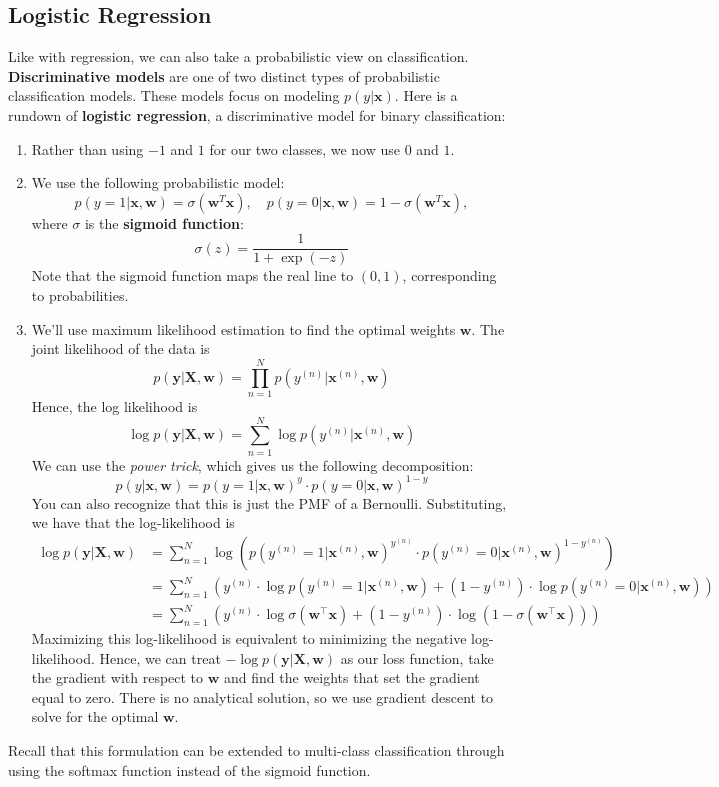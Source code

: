 \documentclass[11pt, letterpaper]{article}
\theoremstyle{definition}
\theoremstyle{plain}
\begin{document}
\subsection{Logistic Regression}

Like with regression, we can also take a probabilistic view on classification. \textbf{Discriminative models} are one of two distinct types of probabilistic classification models. These models focus on modeling $p(y | \bm x)$. Here is a rundown of \textbf{logistic regression}, a discriminative model for binary classification:
\begin{enumerate}
    \item Rather than using $-1$ and $1$ for our two classes, we now use $0$ and $1$. 
    
    \item We use the following probabilistic model:
    \[p(y = 1 | \bm{x}, \bm w) = \sigma(\bm{w}^{T}\bm{x}), \quad p(y = 0 | \bm{x}, \bm w) = 1 - \sigma(\bm{w}^{T}\bm{x} ),\]
    where $\sigma$ is the \textbf{sigmoid function}:
    \[\sigma(z) = \frac{1}{1 + \exp(-z)}\]
    Note that the sigmoid function maps the real line to $(0, 1)$, corresponding to probabilities.

    \item We'll use maximum likelihood estimation to find the optimal weights $\bm{w}$. The joint likelihood of the data is
    \[p(\bm y | \bm X, \bm w) = \prod_{n=1}^{N} p(y^{(n)}|\bm x^{(n)}, \bm w)\]
    Hence, the log likelihood is 
    \[\log p(\bm y | \bm X, \bm w) = \sum_{n=1}^{N} \log p(y^{(n)}|\bm x^{(n)}, \bm w)\]
    We can use the \textit{power trick}, which gives us the following decomposition:
    \[p(y |\bm x, \bm w) = p(y =1|\bm x, \bm w)^y \cdot p(y =0|\bm x, \bm w)^{1-y}\]
    You can also recognize that this is just the PMF of a Bernoulli. Substituting, we have that the log-likelihood is
    \begin{align*}
        \log p(\bm y | \bm X, \bm w) &= \sum_{n=1}^{N} \log\left(p(y^{(n)} =1|\bm x^{(n)}, \bm w)^{y^{(n)}} \cdot p(y^{(n)} =0|\bm x^{(n)}, \bm w)^{1-y^{(n)}} \right) \\
            &= \sum_{n=1}^{N} \left(y^{(n)} \cdot \log p(y^{(n)} =1|\bm x^{(n)}, \bm w) +  (1-y^{(n)}) \cdot \log p(y^{(n)} =0|\bm x^{(n)}, \bm w)\right) \\
            &= \sum_{n=1}^{N} \left(y^{(n)} \cdot \log \sigma(\bm{w}^\top \bm x)+  (1-y^{(n)}) \cdot \log (1-\sigma(\bm{w}^\top \bm x))\right)
    \end{align*}
    Maximizing this log-likelihood is equivalent to minimizing the negative log-likelihood. Hence, we can treat $-\log p(\bm y | \bm X, \bm w)$ as our loss function, take the gradient with respect to $\bm w$ and find the weights that set the gradient equal to zero. There is no analytical solution, so we use gradient descent to solve for the optimal $\bm w$.
\end{enumerate} 
Recall that this formulation can be extended to multi-class classification through using the softmax function instead of the sigmoid function.
\end{document}
